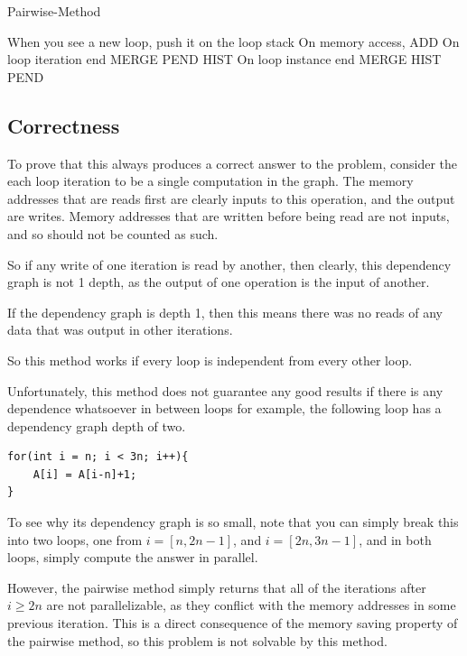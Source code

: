 \documentclass[12pt,twoside]{reedthesis}
\begin{document}
		\begin{algorithm}
			\caption{Pairwise-Method}\label{pairwise-method}
			\begin{algorithmic}[1]
				\State When you see a new loop, push it on the loop stack
				\State On memory access, \textsc{ADD}
				\State On loop iteration end \textsc{MERGE PEND HIST}
				\State On loop instance end \textsc{MERGE HIST PEND}
			\end{algorithmic}
		\end{algorithm}

		\subsection{Correctness}

		To prove that this always produces a correct answer to the problem, consider the each loop iteration to be a single computation in the graph. The memory addresses that are reads first are clearly inputs to this operation, and the output are writes. Memory addresses that are written before being read are not inputs, and so should not be counted as such.

		So if any write of one iteration is read by another, then clearly, this dependency graph is not 1 depth, as the output of one operation is the input of another.

		If the dependency graph is depth 1, then this means there was no reads of any data that was output in other iterations.

		So this method works if every loop is independent from every other loop.

		Unfortunately, this method does not guarantee any good results if there is any dependence whatsoever in between loops for example, the following loop has a dependency graph depth of two.

\begin{lstlisting}
for(int i = n; i < 3n; i++){
	A[i] = A[i-n]+1;
}
\end{lstlisting}

		To see why its dependency graph is so small, note that you can simply break this into two loops, one from $i = [n,2n-1]$, and $i=[2n,3n-1]$, and in both loops, simply compute the answer in parallel.

		However, the pairwise method simply returns that all of the iterations after $i \ge 2n$ are not parallelizable, as they conflict with the memory addresses in some previous iteration. This is a direct consequence of the memory saving property of the pairwise method, so this problem is not solvable by this method.
\end{document}
